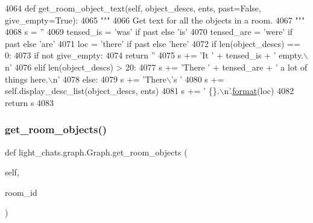 \begin{DoxyCode}
4064     \textcolor{keyword}{def }get\_room\_object\_text(self, object\_descs, ents, past=False, give\_empty=True):
4065         \textcolor{stringliteral}{"""}
4066 \textcolor{stringliteral}{        Get text for all the objects in a room.}
4067 \textcolor{stringliteral}{        """}
4068         s = \textcolor{stringliteral}{''}
4069         tensed\_is = \textcolor{stringliteral}{'was'} \textcolor{keywordflow}{if} past \textcolor{keywordflow}{else} \textcolor{stringliteral}{'is'}
4070         tensed\_are = \textcolor{stringliteral}{'were'} \textcolor{keywordflow}{if} past \textcolor{keywordflow}{else} \textcolor{stringliteral}{'are'}
4071         loc = \textcolor{stringliteral}{'there'} \textcolor{keywordflow}{if} past \textcolor{keywordflow}{else} \textcolor{stringliteral}{'here'}
4072         \textcolor{keywordflow}{if} len(object\_descs) == 0:
4073             \textcolor{keywordflow}{if} \textcolor{keywordflow}{not} give\_empty:
4074                 \textcolor{keywordflow}{return} \textcolor{stringliteral}{''}
4075             s += \textcolor{stringliteral}{'It '} + tensed\_is + \textcolor{stringliteral}{' empty.\(\backslash\)n'}
4076         \textcolor{keywordflow}{elif} len(object\_descs) > 20:
4077             s += \textcolor{stringliteral}{'There '} + tensed\_are + \textcolor{stringliteral}{' a lot of things here.\(\backslash\)n'}
4078         \textcolor{keywordflow}{else}:
4079             s += \textcolor{stringliteral}{'There\(\backslash\)'s '}
4080             s += self.display\_desc\_list(object\_descs, ents)
4081             s += \textcolor{stringliteral}{' \{\}.\(\backslash\)n'}.\hyperlink{namespaceparlai_1_1chat__service_1_1services_1_1messenger_1_1shared__utils_a32e2e2022b824fbaf80c747160b52a76}{format}(loc)
4082         \textcolor{keywordflow}{return} s
4083 
\end{DoxyCode}
\mbox{\label{classlight__chats_1_1graph_1_1Graph_ad078aab1d28474ac43e8b58ba0fb586b}} 
\subsubsection{\texorpdfstring{get\+\_\+room\+\_\+objects()}{get\_room\_objects()}}
{\footnotesize\ttfamily def light\+\_\+chats.\+graph.\+Graph.\+get\+\_\+room\+\_\+objects (\begin{DoxyParamCaption}\item[{}]{self,  }\item[{}]{room\+\_\+id }\end{DoxyParamCaption})}

